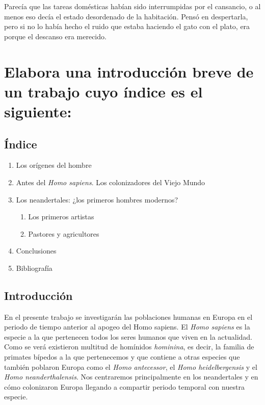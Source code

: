 \documentclass[12pt, a4paper, oneside]{report}
\begin{document}
        Parecía que las tareas domésticas habían sido interrumpidas por el cansancio, o al menos eso decía el
        estado desordenado de la habitación. Pensó en despertarla, pero si no lo había hecho el ruido que
        estaba haciendo el gato con el plato, era porque el descanso era merecido.
        \clearpage
    \chapter{Elabora una introducción breve de un trabajo cuyo índice es el siguiente:}
        \section*{Índice}
        \begin{Large}
            \renewcommand{\labelenumii}{\arabic{enumi}.\arabic{enumii}}
            \begin{enumerate}
                \item Los orígenes del hombre
                \item Antes del \emph{Homo sapiens}. Los colonizadores del Viejo Mundo
                \item Los neandertales: ¿los primeros hombres modernos?
                \begin{enumerate}
                    \item Los primeros artistas
                    \item Pastores y agricultores
                \end{enumerate}
                \item Conclusiones
                \item Bibliografía
            \end{enumerate}
        \end{Large}
        \clearpage
        \section*{Introducción}

    En el presente trabajo se investigarán las poblaciones humanas en Europa en el periodo de tiempo anterior
    al apogeo del Homo sapiens. El \emph{Homo sapiens} es la especie a la que pertenecen todos los seres humanos que
    viven en la actualidad. Como se verá existieron multitud de homínidos \emph{hominina}, es decir, la
    familia de primates bípedos a la que pertenecemos y que contiene a otras especies que también poblaron
    Europa como el \emph{Homo antecessor}, el \emph{Homo heidelbergensis} y el \emph{Homo neanderthalensis}.
    Nos centraremos principalmente en los neandertales y en cómo colonizaron Europa llegando a compartir
    periodo temporal con nuestra especie.
\end{document}
